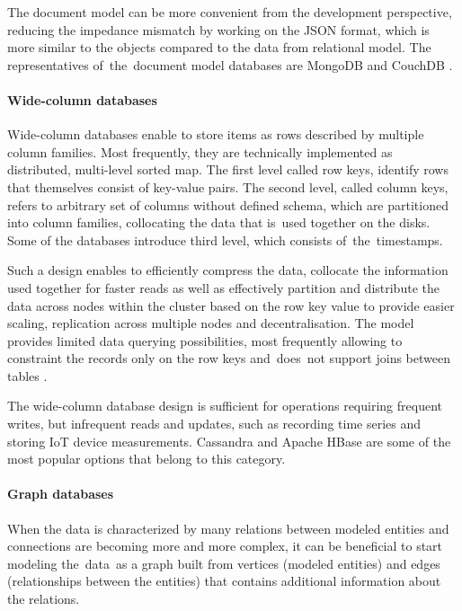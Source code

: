The document model can be more convenient from the development perspective, reducing the impedance mismatch by working on the JSON format, which is more similar to the objects compared to the data from relational model. The representatives of~the~document model databases are MongoDB \cite{MongoDB} and CouchDB \cite{CouchDB}.

\paragraph{Wide-column databases}

Wide-column databases enable to store items as rows described by multiple column families. Most frequently, they are technically implemented as distributed, multi-level sorted map. The first level called row keys, identify rows that themselves consist of key-value pairs. The second level, called column keys, refers to arbitrary set of columns without defined schema, which are partitioned into column families, collocating the data that is~used together on the disks. Some of the databases introduce third level, which consists of~the~timestamps.

Such a design enables to efficiently compress the data, collocate the information used together for faster reads as well as effectively partition and distribute the data across nodes within the cluster based on the row key value to provide easier scaling, replication across multiple nodes and decentralisation. The model provides limited data querying possibilities, most frequently allowing to constraint the records only on the row keys and~does~not support joins between tables \cite{NoSQLDatabaseSystemsSurveyDecisionGuidance}.

The wide-column database design is sufficient for operations requiring frequent writes, but infrequent reads and updates, such as recording time series and storing IoT device measurements. Cassandra \cite{Cassandra} and Apache HBase \cite{HBase} are some of the most popular options that belong to this category.

\paragraph{Graph databases}

When the data is characterized by many relations between modeled entities and connections are becoming more and more complex, it can be beneficial to start modeling the~data~as a graph built from vertices (modeled entities) and edges (relationships between the entities) that contains additional information about the relations. 

